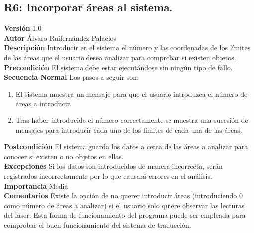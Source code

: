 \subsection{R6: Incorporar áreas al sistema.}
\textbf{Versión} 1.0\\
\textbf{Autor} Álvaro Ruifernández Palacios\\
\textbf{Descripción} Introducir en el sistema el número y las coordenadas de los límites de las áreas que el usuario desea analizar para comprobar si existen objetos.\\
\textbf{Precondición} El sistema debe estar ejecutándose sin ningún tipo de fallo.\\
\textbf{Secuencia Normal} Los pasos a seguir son:
\begin{enumerate}
	\item El sistema muestra un mensaje para que el usuario introduzca el número de áreas a introducir.
	\item Tras haber introducido el número correctamente se muestra una sucesión de mensajes para introducir cada uno de los límites de cada una de las áreas.
\end{enumerate}
\textbf{Postcondición} El sistema guarda los datos a cerca de las áreas a analizar para conocer si existen o no objetos en ellas.\\
\textbf{Excepciones} Si los datos son introducidos de manera incorrecta, serán registrados incorrectamente por lo que causará errores en el análisis.\\
\textbf{Importancia} Media\\
\textbf{Comentarios} Existe la opción de no querer introducir áreas (introduciendo 0 como número de áreas a analizar) si el usuario solo quiere observar las lecturas del láser. Esta forma de funcionamiento del programa puede ser empleada para comprobar el buen funcionamiento del sistema de traducción.\\

